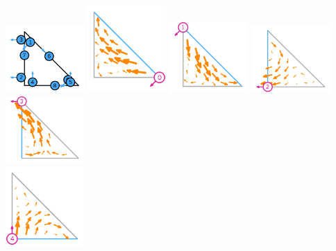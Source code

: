 \begin{itemize}
\begin{center}
\includegraphics[width=3cm]{images/pair_mtw/element-Mardal-Tai-Winther-variant-equispaced-triangle-3-dofs}
\includegraphics[width=3cm]{images/pair_mtw/element-Mardal-Tai-Winther-variant-equispaced-triangle-3-0}
\includegraphics[width=3cm]{images/pair_mtw/element-Mardal-Tai-Winther-variant-equispaced-triangle-3-1}
\includegraphics[width=3cm]{images/pair_mtw/element-Mardal-Tai-Winther-variant-equispaced-triangle-3-2}
\includegraphics[width=3cm]{images/pair_mtw/element-Mardal-Tai-Winther-variant-equispaced-triangle-3-3}\\
\includegraphics[width=3cm]{images/pair_mtw/element-Mardal-Tai-Winther-variant-equispaced-triangle-3-4}

\end{center}
\end{itemize}
